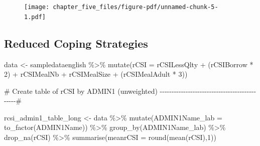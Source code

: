 \documentclass[
  letterpaper,
  DIV=11,
  numbers=noendperiod]{scrreprt}
\newenvironment{Shaded}{\begin{snugshade}}{\end{snugshade}}
\newcommand{\AttributeTok}[1]{\textcolor[rgb]{0.40,0.45,0.13}{#1}}
\newcommand{\CommentTok}[1]{\textcolor[rgb]{0.37,0.37,0.37}{#1}}
\newcommand{\DecValTok}[1]{\textcolor[rgb]{0.68,0.00,0.00}{#1}}
\newcommand{\FunctionTok}[1]{\textcolor[rgb]{0.28,0.35,0.67}{#1}}
\newcommand{\NormalTok}[1]{\textcolor[rgb]{0.00,0.23,0.31}{#1}}
\newcommand{\OtherTok}[1]{\textcolor[rgb]{0.00,0.23,0.31}{#1}}
\newcommand{\SpecialCharTok}[1]{\textcolor[rgb]{0.37,0.37,0.37}{#1}}
\begin{document}
\begin{figure}[H]

{\centering \texttt{[image: chapter\_five\_files/figure-pdf/unnamed-chunk-5-1.pdf]}

}

\end{figure}

\hypertarget{reduced-coping-strategies}{%
\subsection{Reduced Coping Strategies}\label{reduced-coping-strategies}}

\begin{Shaded}
\begin{Highlighting}[]
\NormalTok{data }\OtherTok{\textless{}{-}}\NormalTok{ sampledataenglish }\SpecialCharTok{\%\textgreater{}\%} \FunctionTok{mutate}\NormalTok{(}\AttributeTok{rCSI =}\NormalTok{ rCSILessQlty }\SpecialCharTok{+} 
\NormalTok{                          (rCSIBorrow }\SpecialCharTok{*} \DecValTok{2}\NormalTok{) }\SpecialCharTok{+} 
\NormalTok{                          rCSIMealNb }\SpecialCharTok{+} 
\NormalTok{                          rCSIMealSize }\SpecialCharTok{+} 
\NormalTok{                          (rCSIMealAdult }\SpecialCharTok{*} \DecValTok{3}\NormalTok{))}

\CommentTok{\# Create table of rCSI by ADMIN1 (unweighted) {-}{-}{-}{-}{-}{-}{-}{-}{-}{-}{-}{-}{-}{-}{-}{-}{-}{-}{-}{-}{-}{-}{-}{-}{-}{-}{-}{-}{-}{-}{-}{-}{-}{-}{-}{-}{-}{-}{-}{-}{-}{-}{-}{-}{-}{-}\#}

\NormalTok{rcsi\_admin1\_table\_long }\OtherTok{\textless{}{-}}\NormalTok{ data }\SpecialCharTok{\%\textgreater{}\%} 
  \FunctionTok{mutate}\NormalTok{(}\AttributeTok{ADMIN1Name\_lab =} \FunctionTok{to\_factor}\NormalTok{(ADMIN1Name)) }\SpecialCharTok{\%\textgreater{}\%} 
  \FunctionTok{group\_by}\NormalTok{(ADMIN1Name\_lab) }\SpecialCharTok{\%\textgreater{}\%} 
  \FunctionTok{drop\_na}\NormalTok{(rCSI) }\SpecialCharTok{\%\textgreater{}\%}   
  \FunctionTok{summarise}\NormalTok{(}\AttributeTok{meanrCSI =} \FunctionTok{round}\NormalTok{(}\FunctionTok{mean}\NormalTok{(rCSI),}\DecValTok{1}\NormalTok{))}
\end{Highlighting}
\end{Shaded}
\end{document}
